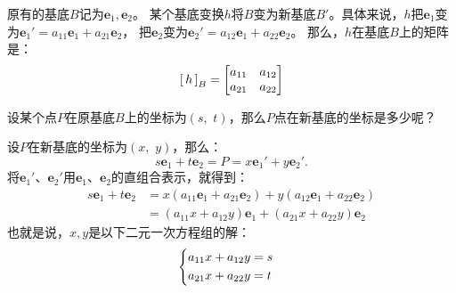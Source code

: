 \documentclass[12pt,UTF8,fontset=none]{ctexbook}
\begin{document}
原有的基底$B$记为$\mathbf{e}_1, \mathbf{e}_2$。
某个基底变换$h$将$B$变为新基底$B'$。具体来说，$h$把$\mathbf{e}_1$变为$\mathbf{e}_1' = a_{11}\mathbf{e}_1 + a_{21}\mathbf{e}_2$，
把$\mathbf{e}_2$变为$\mathbf{e}_2' = a_{12}\mathbf{e}_1 + a_{22}\mathbf{e}_2$。
那么，$h$在基底$B$上的矩阵是：
$$
\bmat{h}[B] = 
\begin{bmatrix}
    a_{11} & a_{12} \\ a_{21} & a_{22}
\end{bmatrix}
$$

设某个点$P$在原基底$B$上的坐标为$(s,\,\, t)$，那么$P$点在新基底的坐标是多少呢？

设$P$在新基底的坐标为$(x,\,\, y)$，那么：
$$ s\mathbf{e}_1 + t\mathbf{e}_2 = P = x\mathbf{e}_1' + y\mathbf{e}_2'.$$
将$\mathbf{e}_1'$、$\mathbf{e}_2'$用$\mathbf{e}_1$、$\mathbf{e}_2$的直组合表示，就得到：
\begin{align*}
    s\mathbf{e}_1 + t\mathbf{e}_2 &= x(a_{11}\mathbf{e}_1 + a_{21}\mathbf{e}_2) + y(a_{12}\mathbf{e}_1 + a_{22}\mathbf{e}_2)  \\
    &= (a_{11}x + a_{12}y)\mathbf{e}_1 + (a_{21}x + a_{22}y)\mathbf{e}_2 
\end{align*}
也就是说，$x, y$是以下二元一次方程组的解：
\begin{alignat*}{1}
    &   \begin{dcases}
            a_{11}x + a_{12}y = s \\
            a_{21}x + a_{22}y = t
        \end{dcases}
\end{alignat*}
\end{document}
